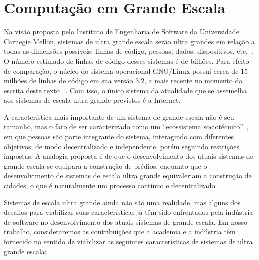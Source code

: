 
\chapter{Computação em Grande Escala}
\label{cap:escala}

Na visão proposta pelo Instituto de Engenharia de Software da Universidade Carnegie Mellon, sistemas de ultra grande escala serão ultra grandes em relação a todas as dimensões possíveis: linhas de código, pessoas, dados, dispositivos, etc.~\cite{CarnegieMellon2006ULS}. O número estimado de linhas de código desses sistemas é de bilhões. Para efeito de comparação, o núcleo do sistema operacional GNU/Linux possui cerca de 15 milhões de linhas de código em sua versão 3.2, a mais recente no momento da escrita deste texto~\cite{Leemhuis2012Statistics} . Com isso, o único sistema da atualidade que se assemelha aos sistemas de escala ultra grande previstos é a Internet. 

A característica mais importante de um sistema de grande escala não é seu tamanho, mas o fato de ser caracterizado como um ``ecossistema sociotécnico''~\cite{CarnegieMellon2006ULS}, em que pessoas são parte integrante do sistema, interagindo com diferentes objetivos, de modo decentralizado e independente, porém seguindo restrições impostas. A analogia proposta é de que o desenvolvimento dos atuais sistemas de grande escala se equipara a construção de prédios, enquanto que o desenvolvimento de sistemas de escala ultra grande equivaleriam a construção de cidades, o que é naturalmente um processo contínuo e decentralizado.

Sistemas de escala ultra grande ainda não são uma realidade, mas alguns dos desafios para viabilizar suas características já têm sido enfrentados pela indústria de software no desenvolvimento dos atuais sistemas de grande escala. Em nosso trabalho, consideraremos as contribuições que a academia e a indústria têm fornecido no sentido de viabilizar as seguintes características de sistemas de ultra grande escala:

